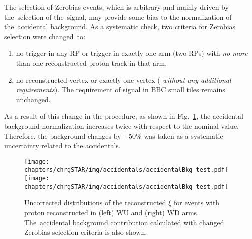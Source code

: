 The selection of Zerobias events, which is arbitrary and mainly driven by the~selection of the~signal, may provide some bias to the normalization of the~accidental background. As a systematic check, two criteria for  Zerobias selection were changed~to:
 \begin{enumerate}
 	\item no trigger in any RP or trigger in exactly one arm (two RPs) with \textit{no more} than one reconstructed proton track in that arm,
 	\item no reconstructed vertex or exactly one vertex (%
 	\textit{without any additional requirements}). The requirement of signal in BBC small tiles remains unchanged. 
 \end{enumerate}
 As a result of this change in the procedure, as shown in Fig.~\ref{fig:STARaccidentalsXiSyst}, the accidental background normalization increases twice with respect to the nominal value. Therefore, the background changes by $\pm50\%$ was taken as a systematic uncertainty related to the accidentals.
 
 \begin{figure}[h!]
 	\centering
 	\texttt{[image: chapters/chrgSTAR/img/accidentals/accidentalBkg\_test.pdf]}
 	\texttt{[image: chapters/chrgSTAR/img/accidentals/accidentalBkg\_test.pdf]}
 	\caption{Uncorrected distributions of the reconstructed $\xi$ for events with proton reconstructed in (left) WU and (right) WD arms. The~accidental background contribution calculated with changed Zerobias selection criteria is also shown.}
 	\label{fig:STARaccidentalsXiSyst}
 \end{figure}




